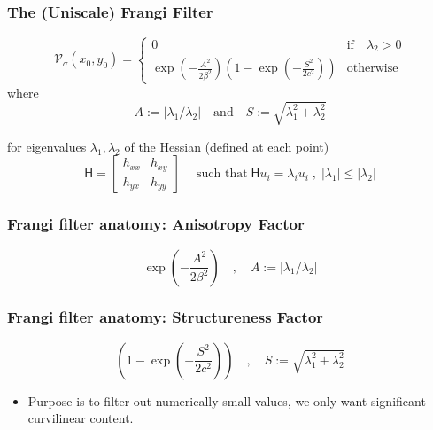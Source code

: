 \documentclass[9pt,notes]{beamer}
\newcommand{\Vsigma}{\ensuremath{\mathcal{V}_{\sigma}}\xspace}
\begin{document}
\begin{frame}
\frametitle{The (Uniscale) Frangi Filter}
  \begin{equation}
  \Vsigma(x_0,y_0) =
  \begin{cases}
  0 & \text{if} \quad \lambda_2 > 0 \\
  \exp\left(-\frac{A^2}{2\beta^2}\right)
  \left(1 - \exp\left(-\frac{S^2}{2c^2}\right)\right) & \textrm{otherwise}
  \end{cases}
  \end{equation}
where
  \begin{equation}
  A := \left|\lambda_1 / \lambda_2\right|
  \quad \textrm{and} \quad 
  S := \sqrt{\lambda_1^2 + \lambda_2^2}
  \end{equation}

for eigenvalues $\lambda_1, \lambda_2$ of the Hessian (defined at each point)
  \begin{equation}
    \mathsf{H} = \begin{bmatrix} h_{xx} & h_{xy} \\
                                 h_{yx} & h_{yy}
                 \end{bmatrix}
    \quad \;\textrm{such that}\;
    \mathsf{H} u_i = \lambda_i u_i \;,\;
    \left|\lambda_1\right| \leq \left|\lambda_2\right|
  \end{equation}
\end{frame}

\begin{frame}
\frametitle[Anisotropy Factor]{Frangi filter anatomy: Anisotropy Factor}
\begin{equation}
\exp\left(-\frac{A^2}{2\beta^2}\right) \quad,\quad
A := \left|\lambda_1 / \lambda_2\right|
\end{equation}
\end{frame}

\begin{frame}
\frametitle[Structureness Factor]{Frangi filter anatomy: Structureness Factor}
\begin{equation}
\left(1 - \exp\left(-\frac{S^2}{2c^2}\right)\right)
\quad,\quad
S := \sqrt{\lambda_1^2 + \lambda_2^2}
\end{equation}
\begin{itemize}
  \item Purpose is to filter out numerically small values, we only want significant curvilinear content.
\end{itemize}
\end{frame}
\end{document}
